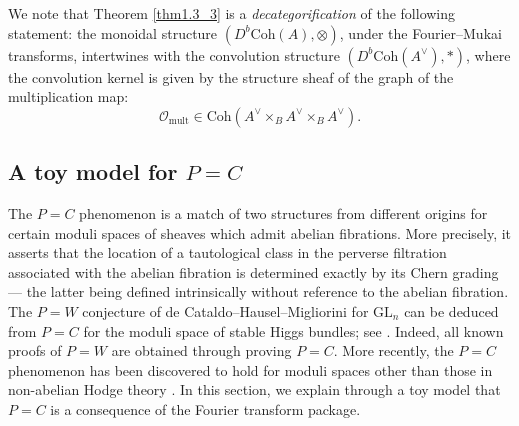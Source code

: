 \documentclass[11pt]{amsart}
\theoremstyle{plain}
\theoremstyle{definition}
\theoremstyle{remark}
\newcommand{\CO}{{\mathcal O}}
\begin{document}
We note that Theorem \ref{thm1.3_3} is a \emph{decategorification} of the following statement: the monoidal structure $(D^b\mathrm{Coh}(A), \otimes)$, under the Fourier--Mukai transforms, intertwines with the convolution structure $(D^b\mathrm{Coh}(A^\vee), \ast)$, where the convolution kernel is given by the structure sheaf of the graph of the multiplication map:
\[
\CO_{\mathrm{mult}} \in \mathrm{Coh}\left(A^\vee \times_B A^\vee \times_B A^\vee\right).
\]






\subsection{A toy model for $P=C$}\label{sec1.4}
The $P=C$ phenomenon is a match of two structures from different origins for certain moduli spaces of sheaves which admit abelian fibrations. More precisely, it asserts that the location of a tautological class in the perverse filtration associated with the abelian fibration is determined exactly by its Chern grading --- the latter being defined intrinsically without reference to the abelian fibration. The $P=W$ conjecture of de Cataldo--Hausel--Migliorini \cite{dCHM} for $\mathrm{GL}_n$ can be deduced from $P=C$ for the moduli space of stable Higgs bundles; see \cite[Section 0.3]{dCMS}. Indeed, all known proofs \cite{MS_PW, HMMS, MSY} of $P=W$ are obtained through proving $P=C$. More recently, the $P=C$ phenomenon has been discovered to hold for moduli spaces other than those in non-abelian Hodge theory \cite{KPS, KLMP}. In this section, we explain through a toy model that $P=C$ is a consequence of the Fourier transform package.
\end{document}
